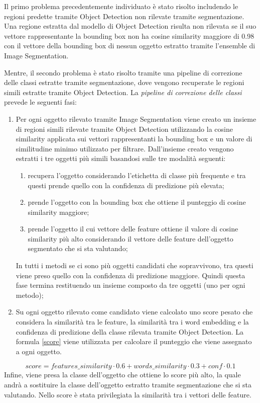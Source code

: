 Il primo problema precedentemente individuato è stato risolto includendo le regioni predette tramite Object Detection non rilevate tramite segmentazione. Una regione estratta dal modello di Object Detection risulta non rilevata se il suo vettore rappresentante la bounding box non ha cosine similarity maggiore di 0.98 con il vettore della bounding box di nessun oggetto estratto tramite l'ensemble di Image Segmentation.


Mentre, il secondo problema è stato risolto tramite una pipeline di correzione delle classi estratte tramite segmentazione, dove vengono recuperate le regioni simili estratte tramite Object Detection.
La \textit{pipeline di correzione delle classi} prevede le seguenti fasi:
\begin{enumerate}
    \item Per ogni oggetto rilevato tramite Image Segmentation viene creato un insieme di regioni simili rilevate tramite Object Detection utilizzando la cosine similarity applicata sui vettori rappresentanti la bounding box e un valore di similitudine minimo utilizzato per filtrare. Dall'insieme creato vengono estratti i tre oggetti più simili basandosi sulle tre modalità seguenti:
    \begin{enumerate}[leftmargin=2.5cm,label=Metodo \arabic*:]
        \item recupera l'oggetto considerando l'etichetta di classe più frequente e tra questi prende quello con la confidenza di predizione più elevata;
        \item prende l'oggetto con la bounding box che ottiene il punteggio di cosine similarity maggiore;
        \item prende l'oggetto il cui vettore delle feature ottiene il valore di cosine similarity più alto considerando il vettore delle feature dell'oggetto segmentato che si sta valutando;
    \end{enumerate}
    In tutti i metodi se ci sono più oggetti candidati che sopravvivono, tra questi viene preso quello con la confidenza di predizione maggiore.
    Quindi questa fase termina restituendo un insieme composto da tre oggetti (uno per ogni metodo);
    \item Su ogni oggetto rilevato come candidato viene calcolato uno score pesato che considera la similarità tra le feature, la similarità tra i word embedding e la confidenza di predizione della classe rilevata tramite Object Detection. La formula \ref{score} viene utilizzata per calcolare il punteggio che viene assegnato a ogni oggetto.
\end{enumerate}
\begin{equation}\label{score}
        score = features\_similarity  \cdot  0.6 + words\_similarity  \cdot  0.3 + conf  \cdot  0.1
\end{equation}
Infine, viene presa la classe dell'oggetto che ottiene lo score più alto, la quale andrà a sostituire la classe dell'oggetto estratto tramite segmentazione che si sta valutando.
Nello score è stata privilegiata la similarità tra i vettori delle feature.


